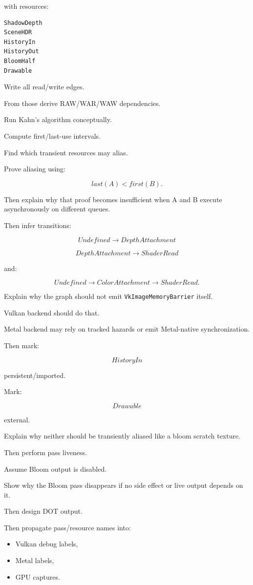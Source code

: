 with resources:

\begin{verbatim}
ShadowDepth
SceneHDR
HistoryIn
HistoryOut
BloomHalf
Drawable
\end{verbatim}

Write all read/write edges.

From those derive RAW/WAR/WAW dependencies.

Run Kahn's algorithm conceptually.

Compute first/last-use intervals.

Find which transient resources may alias.

Prove aliasing using:

\[
last(A)<first(B).
\]

Then explain why that proof becomes insufficient when A and B execute asynchronously on different queues.

Then infer transitions:

\[
Undefined
\rightarrow
DepthAttachment
\]

\[
DepthAttachment
\rightarrow
ShaderRead
\]

and:

\[
Undefined
\rightarrow
ColorAttachment
\rightarrow
ShaderRead.
\]

Explain why the graph should not emit \texttt{VkImageMemoryBarrier} itself.

Vulkan backend should do that.

Metal backend may rely on tracked hazards or emit Metal-native synchronization.

Then mark:

\[
HistoryIn
\]

persistent/imported.

Mark:

\[
Drawable
\]

external.

Explain why neither should be transiently aliased like a bloom scratch texture.

Then perform pass liveness.

Assume Bloom output is disabled.

Show why the Bloom pass disappears if no side effect or live output depends on it.

Then design DOT output.

Then propagate pass/resource names into:

\begin{itemize}
\tightlist
\item
  Vulkan debug labels,
\item
  Metal labels,
\item
  GPU captures.
\end{itemize}


